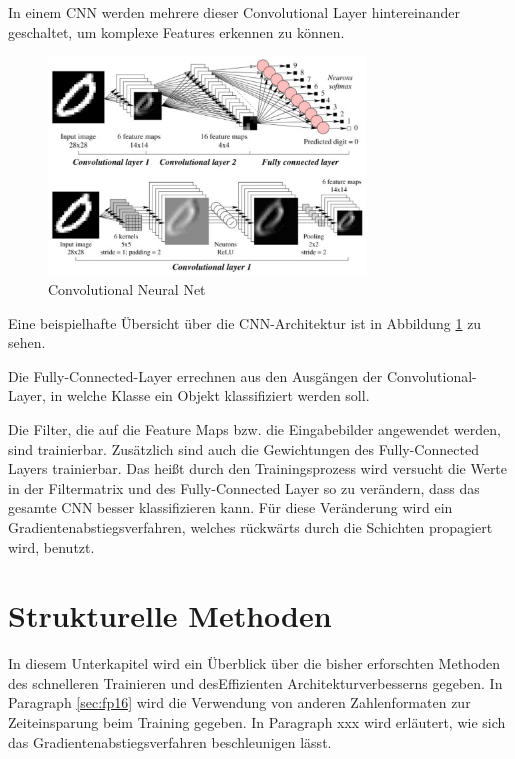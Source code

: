 In einem CNN werden mehrere dieser Convolutional Layer hintereinander geschaltet, um komplexe Features erkennen zu können. 
\begin{figure}[H]
  \centering
  \includegraphics[width=0.75\textwidth]{images/cnn.pdf}
  \caption{Convolutional Neural Net \cite{CNNImg}}
  \label{fig:cnn}
\end{figure}



Eine beispielhafte Übersicht über die CNN-Architektur ist in Abbildung \ref{fig:cnn} zu sehen.

Die Fully-Connected-Layer errechnen aus den Ausgängen der Convolutional-Layer, in welche Klasse ein Objekt klassifiziert werden soll.  

Die Filter, die auf die Feature Maps bzw. die Eingabebilder angewendet werden, sind trainierbar. Zusätzlich sind auch die Gewichtungen des Fully-Connected Layers trainierbar. Das heißt durch den Trainingsprozess wird versucht die Werte in der Filtermatrix und des Fully-Connected Layer so zu verändern, dass das gesamte CNN besser klassifizieren kann. Für diese Veränderung wird ein Gradientenabstiegsverfahren, welches rückwärts durch die Schichten propagiert wird, benutzt.



\section{Strukturelle Methoden}
In diesem Unterkapitel wird ein Überblick über die bisher erforschten Methoden des schnelleren Trainieren und desEffizienten Architekturverbesserns gegeben. In Paragraph \ref{sec:fp16} wird die Verwendung von anderen Zahlenformaten zur Zeiteinsparung beim Training gegeben. In Paragraph xxx wird erläutert, wie sich das Gradientenabstiegsverfahren beschleunigen lässt. 

